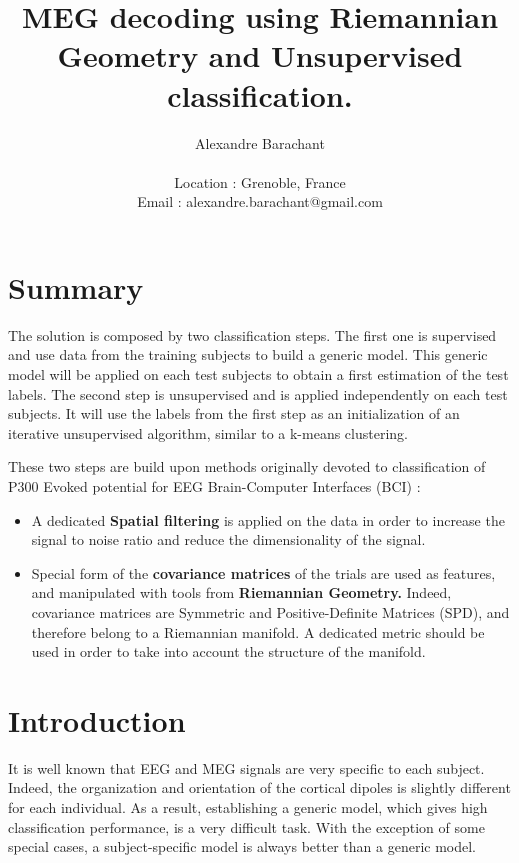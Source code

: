\documentclass[11pt,a4paper]{article}
\title{\textbf{MEG decoding using Riemannian Geometry and Unsupervised classification.}}
\author{Alexandre Barachant \\ \\ Location : Grenoble, France \\ Email : alexandre.barachant@gmail.com }
\date{}
\begin{document}
\maketitle

\section{Summary}
The solution is composed by two classification steps. The first one is supervised and use data from the training subjects to build a generic model. This generic model will be applied on each test subjects to obtain a first estimation of the test labels. The second step is unsupervised and is applied independently on each test subjects. It will use the labels from the first step as an initialization of an iterative unsupervised algorithm, similar to a k-means clustering. 

These two steps are build upon methods originally devoted to classification of P300 Evoked potential for EEG Brain-Computer Interfaces (BCI) :
\begin{itemize}
\item A dedicated \textbf{Spatial filtering} is applied on the data in order to increase the signal to noise ratio and reduce the dimensionality of the signal.
\item Special form of the \textbf{covariance matrices} of the trials are used as features, and manipulated with tools from \textbf{Riemannian Geometry.} Indeed, covariance matrices are Symmetric and Positive-Definite Matrices (SPD), and therefore belong to a Riemannian manifold. A dedicated metric should be used in order to take into account the structure of the manifold.
\end{itemize}

\section{Introduction}
It is well known that EEG and MEG signals are very specific to each subject. Indeed, the organization and orientation of the cortical dipoles is slightly different for each individual. As a result, establishing a generic model, which gives high classification performance, is a very difficult task. With the exception of some special cases, a subject-specific model is always better than a generic model.
\end{document}
